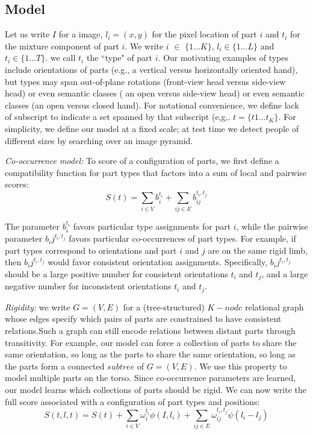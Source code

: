 \subsection{Model}
Let us write $I$ for a image, $l_i = (x,y)$ for the pixel location of part $i$ and $t_i$ for the mixture component of part $i$. We write $i$ $\in$  $\{1\dotsc K\}$, $l_i \in \{1\dotsc L\}$ and $t_i \in \{1\dotsc T\}$. we call $t_i$ the ``type" of part $i$.
 Our motivating examples of types include orientations of parts (e.g., a vertical versus horizontally oriented hand), but types may span out-of-plane
rotations (front-view head versus side-view head) or even semantic classes ( an open versus side-view head) or even semantic classes (an open versus closed hand). For notational
convenience, we define lack of subscript to indicate a set spanned by that subscript
(e,g,. $t=\{t1\dotsc t_K\}$. For simplicity, we define our model at a fixed scale; at test time we detect people of different sizes by searching over an image pyramid.

\textit{Co-occurrence model:} To score of a configuration of parts, we first 
define a compatibility function for part types that factors into a sum of local and pairwise scores:
\begin{equation}
S(t)=\sum_{i\in V} b_i^{t_i} + \sum_{ij\in E} b_{ij}^{t_i,t_j}
\end{equation}

The parameter $b_i^{t_i}$ favors particular type assignments for part $i$, while
the pairwise parameter $b_ij^{t_i,t_j}$ favors particular co-occurrences of part types.
For example, if part types correspond to orientations and part $i$ and $j$ are on the
same rigid limb, then  $b_ij^{t_i,t_j}$ would favor consistent orientation assignments.
Specifically,  $b_ij^{t_i,t_j}$ should be a large positive number for consistent
orientations $t_i$ and $t_j$, and a large negative number for inconsistent orientations
$t_i$ and $t_j$.

\textit{Rigidity:} we write $G = (V,E)$ for a (tree-structured) $K-node$ relational
graph whose edges specify which pairs of parts are constrained to have consistent
relations.Such a graph can still encode relations between distant parts through transitivity.
For example, our model can force a collection of parts to share the same orientation,
so long as the parts to share the same orientation, so long as the parts form a connected
$subtree$ of $G = (V,E)$. We use this property to model multiple parts on the torso.
Since co-occurrence parameters are learned, our model learns which collections of parts should be rigid.
We can now write the full score associated with a configuration of part types and positions:
\begin{equation}
\label{eq:rigidity}
S(t,l,t)=S(t) + \sum_{i\in V} \omega_i^{t_i} \dot \phi(I,l_i) + \sum_{ij\in E} \omega_{ij}^{t_i,t_j} \dot \psi(l_i - l_j)
\end{equation}

